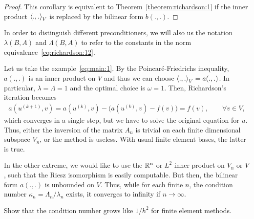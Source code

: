 \begin{proof}
  This corollary is equivalent to Theorem~\ref{theorem:richardson:1}
  if the inner product $\scal(.,.)_V$ is replaced by the bilinear form
  $b(.,.)$.
\end{proof}

\begin{notation}
  In order to distinguish different preconditioners, we will also us
  the notation $\lambda(B, A)$ and $\Lambda(B,A)$ to refer to the
  constants in the norm equivalence~\eqref{eq:richardson:12}.
\end{notation}


\begin{example}
  Let us take the example~\eqref{eq:main:1}.
  By the Poincaré-Friedrichs inequality, $a(.,.)$ is an inner product
  on $V$ and thus we can choose $\scal(.,.)_V = a(.,.)$. In
  particular, $\lambda = \Lambda = 1$ and the optimal choice is
  $\omega = 1$. Then, Richardson's iteration becomes
  \begin{gather*}
    a(u^{(k+1)},v) = a(u^{(k)},v)
    - \bigl(a(u^{(k)},v) - f(v)\bigr) =  f(v), \qquad \forall v\in V,
  \end{gather*}
  which converges in a single step, but we have to solve the original
  equation for $u$. Thus, either the inversion of the matrix $A_n$ is
  trivial on each finite dimensional subspace $V_n$, or the method is
  useless. With usual finite element bases, the latter is true.
\end{example}

\begin{example}
  In the other extreme, we would like to use the $\mathbb R^n$ or $L^2$
  inner product on $V_n$ or $V$, such that the Riesz isomorphism is
  easily computable. But then, the bilinear form $a(.,.)$ is unbounded
  on $V$. Thus, while for each finite $n$, the condition number
  $\kappa_n = \Lambda_n/\lambda_n$ exists, it converges to infinity if
  $n\to\infty$.
\end{example}

\begin{todo}
  Show that the condition number grows like $1/h^2$ for finite element
  methods.
\end{todo}

